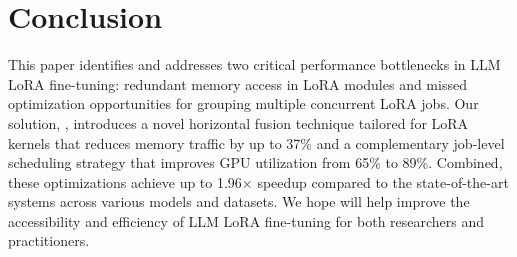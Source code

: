 \section{Conclusion}
\label{sec:conclusion}

This paper identifies and addresses two critical performance bottlenecks in LLM LoRA fine-tuning: 
redundant memory access in LoRA modules and missed optimization opportunities for grouping multiple concurrent LoRA jobs. 
Our solution, \Name, introduces a novel horizontal fusion technique tailored for LoRA kernels that reduces memory traffic by up to 37\% and a complementary job-level scheduling strategy that improves GPU utilization from 65\% to 89\%. 
Combined, these optimizations achieve up to 1.96$\times$ speedup compared to the state-of-the-art systems across various models and datasets. 
We hope \Name will help improve the accessibility and efficiency of LLM LoRA fine-tuning for both researchers and practitioners.
